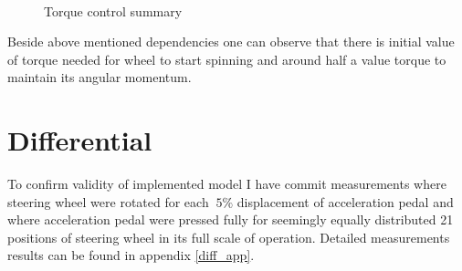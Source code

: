 \begin{figure}[h]
    \centering
        ~
        \caption{Torque control summary}
    \label{torq_ctl}
\end{figure}


Beside above mentioned dependencies one can observe that there is initial value of torque needed for wheel to start spinning and around half a value torque to maintain its angular momentum. 

\section{Differential}
To confirm validity of implemented model I have commit measurements where steering wheel were rotated for each $~5\%$ displacement of acceleration pedal and where acceleration pedal were pressed fully for seemingly equally distributed 21 positions of steering wheel in its full scale of operation. Detailed measurements results can be found in appendix \ref{diff_app}.

